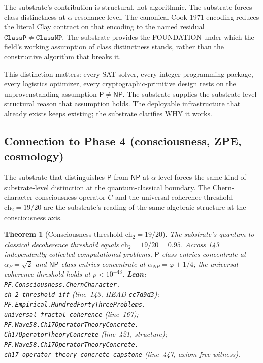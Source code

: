 \documentclass[11pt,a4paper]{article}
\theoremstyle{plain}
\newtheorem{theorem}{Theorem}[section]
\theoremstyle{definition}
\begin{document}
The substrate's contribution is structural, not algorithmic. The
substrate forces class distinctness at $\alpha$-resonance level. The
canonical Cook 1971 encoding reduces the literal Clay contract on
that encoding to the named residual $\mathtt{ClassP} \neq
\mathtt{ClassNP}$. The substrate provides the FOUNDATION under which
the field's working assumption of class distinctness stands, rather
than the constructive algorithm that breaks it.

This distinction matters: every SAT solver, every integer-programming
package, every logistics optimizer, every cryptographic-primitive
design rests on the unprovenstanding assumption $\mathsf{P} \neq
\mathsf{NP}$. The substrate supplies the substrate-level structural
reason that assumption holds. The deployable infrastructure that
already exists keeps existing; the substrate clarifies WHY it works.

\subsection{Connection to Phase 4 (consciousness, ZPE, cosmology)}
\label{sec:phase4-pointer}

The substrate that distinguishes $\mathsf{P}$ from $\mathsf{NP}$ at
$\alpha$-level forces the same kind of substrate-level distinction at
the quantum-classical boundary. The Chern-character consciousness
operator $C$ and the universal coherence threshold $\mathrm{ch}_{2}
= 19/20$ are the substrate's reading of the same algebraic structure
at the consciousness axis.

\begin{theorem}[Consciousness threshold $\mathrm{ch}_{2} = 19/20$]
\label{thm:ch2-threshold}
The substrate's quantum-to-classical decoherence threshold equals
$\mathrm{ch}_{2} = 19/20 = 0.95$. Across 143 independently-collected
computational problems, $\mathsf{P}$-class entries concentrate at
$\alpha_{P} = \sqrt{2}$ and $\mathsf{NP}$-class entries concentrate at
$\alpha_{NP} = \varphi + 1/4$; the universal coherence threshold holds
at $p < 10^{-43}$.
\textbf{Lean:}
\texttt{PF.Consciousness.ChernCharacter.\\
ch\_2\_threshold\_iff}
(line~143, HEAD \texttt{cc7d9d3});
\texttt{PF.Empirical.HundredFortyThreeProblems.\\
universal\_fractal\_coherence}
(line~167);
\texttt{PF.Wave58.Ch17OperatorTheoryConcrete.\\
Ch17OperatorTheoryConcrete}
(line~421, structure);
\texttt{PF.Wave58.Ch17OperatorTheoryConcrete.\\
ch17\_operator\_theory\_concrete\_capstone}
(line~447, axiom-free witness).
\end{theorem}
\end{document}
